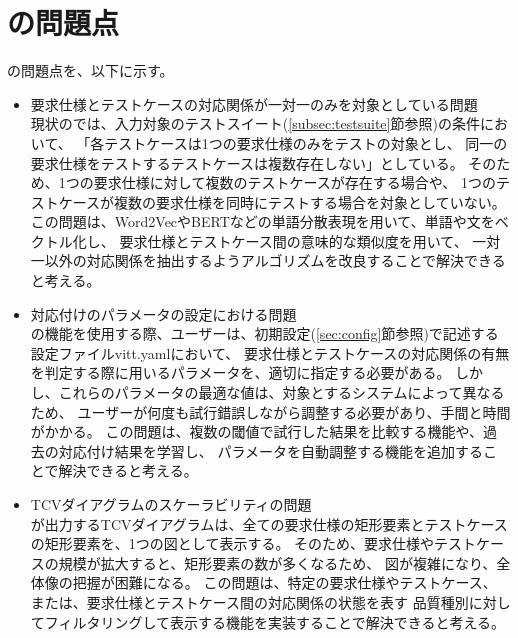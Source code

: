 \section{\tool{}の問題点}\label{sec:problem}

\tool{}の問題点を、以下に示す。

\begin{itemize}
    \item 要求仕様とテストケースの対応関係が一対一のみを対象としている問題\\
    現状の\tool{}では、入力対象のテストスイート(\ref{subsec:testsuite}節参照)の条件において、
    「各テストケースは1つの要求仕様のみをテストの対象とし、
    同一の要求仕様をテストするテストケースは複数存在しない」としている。
    そのため、1つの要求仕様に対して複数のテストケースが存在する場合や、
    1つのテストケースが複数の要求仕様を同時にテストする場合を対象としていない。
    この問題は、Word2Vec\cite{word2vec}やBERT\cite{bert}などの単語分散表現を用いて、単語や文をベクトル化し、
    要求仕様とテストケース間の意味的な類似度を用いて、
    一対一以外の対応関係を抽出するようアルゴリズムを改良することで解決できると考える。

    \item 対応付けのパラメータの設定における問題\\
    \tool{}の機能を使用する際、ユーザーは、初期設定(\ref{sec:config}節参照)で記述する設定ファイルvitt.yamlにおいて、
    要求仕様とテストケースの対応関係の有無を判定する際に用いるパラメータを、適切に指定する必要がある。
    しかし、これらのパラメータの最適な値は、対象とするシステムによって異なるため、
    ユーザーが何度も試行錯誤しながら調整する必要があり、手間と時間がかかる。
    この問題は、複数の閾値で試行した結果を比較する機能や、過去の対応付け結果を学習し、
    パラメータを自動調整する機能を追加することで解決できると考える。

    \item TCVダイアグラムのスケーラビリティの問題\\
    \tool{}が出力するTCVダイアグラムは、全ての要求仕様の矩形要素とテストケースの矩形要素を、1つの図として表示する。
    そのため、要求仕様やテストケースの規模が拡大すると、矩形要素の数が多くなるため、
    図が複雑になり、全体像の把握が困難になる。
    この問題は、特定の要求仕様やテストケース、
    または、要求仕様とテストケース間の対応関係の状態を表す
    品質種別に対してフィルタリングして表示する機能を実装することで解決できると考える。
\end{itemize}